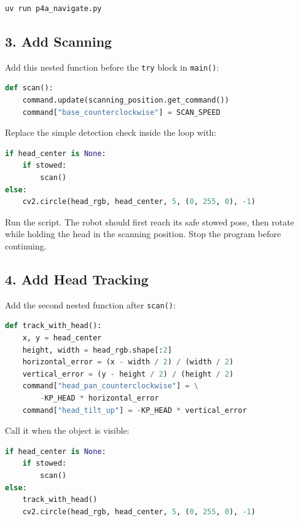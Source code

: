 \documentclass[11pt,a4paper]{article}
\begin{document}
\begin{lstlisting}[language=bash]
uv run p4a_navigate.py
\end{lstlisting}

\subsection*{3. Add Scanning}

Add this nested function before the \texttt{try} block in \texttt{main()}:

\begin{lstlisting}[language=Python]
def scan():
    command.update(scanning_position.get_command())
    command["base_counterclockwise"] = SCAN_SPEED
\end{lstlisting}

Replace the simple detection check inside the loop with:

\begin{lstlisting}[language=Python]
if head_center is None:
    if stowed:
        scan()
else:
    cv2.circle(head_rgb, head_center, 5, (0, 255, 0), -1)
\end{lstlisting}

Run the script. The robot should first reach its safe stowed pose, then rotate
while holding the head in the scanning position. Stop the program before
continuing.

\subsection*{4. Add Head Tracking}

Add the second nested function after \texttt{scan()}:

\begin{lstlisting}[language=Python]
def track_with_head():
    x, y = head_center
    height, width = head_rgb.shape[:2]
    horizontal_error = (x - width / 2) / (width / 2)
    vertical_error = (y - height / 2) / (height / 2)
    command["head_pan_counterclockwise"] = \
        -KP_HEAD * horizontal_error
    command["head_tilt_up"] = -KP_HEAD * vertical_error
\end{lstlisting}

Call it when the object is visible:

\begin{lstlisting}[language=Python]
if head_center is None:
    if stowed:
        scan()
else:
    track_with_head()
    cv2.circle(head_rgb, head_center, 5, (0, 255, 0), -1)
\end{lstlisting}
\end{document}
